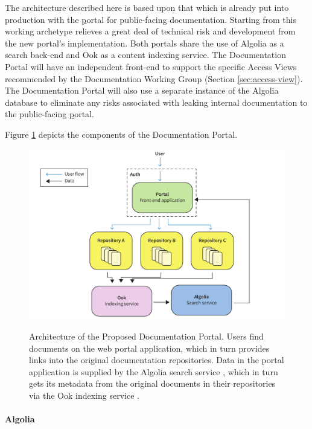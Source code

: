 The architecture described here is based upon that which is already put into production with the \href{www.lsst.io} portal for public-facing documentation.
Starting from this working archetype relieves a great deal of technical risk and development from the new portal's implementation.
Both portals share the use of Algolia \citep{Algolia-cite} as a search back-end and Ook \citep{ook-cite} as a content indexing service.
The Documentation Portal will have an independent front-end to support the specific Access Views recommended by the Documentation Working Group (Section \ref{sec:access-view}).
The Documentation Portal will also use a separate instance of the Algolia database to eliminate any risks associated with leaking internal documentation to the public-facing \href{www.lsst.io} portal.

Figure \ref{fig:portal-architecture} depicts the components of the Documentation Portal.

\begin{figure}[t]
\caption{Architecture of the Proposed Documentation Portal.
Users find documents on the web portal application, which in turn provides links into the original documentation repositories.
Data in the portal application is supplied by the Algolia search service \citep{Algolia-cite}, which in turn gets its metadata from the original documents in their repositories via the Ook indexing service \citep{ook-cite}.}
\centering
\includegraphics[width=\textwidth]{portal-architecture}
\label{fig:portal-architecture}
\end{figure}

\paragraph{Algolia}

